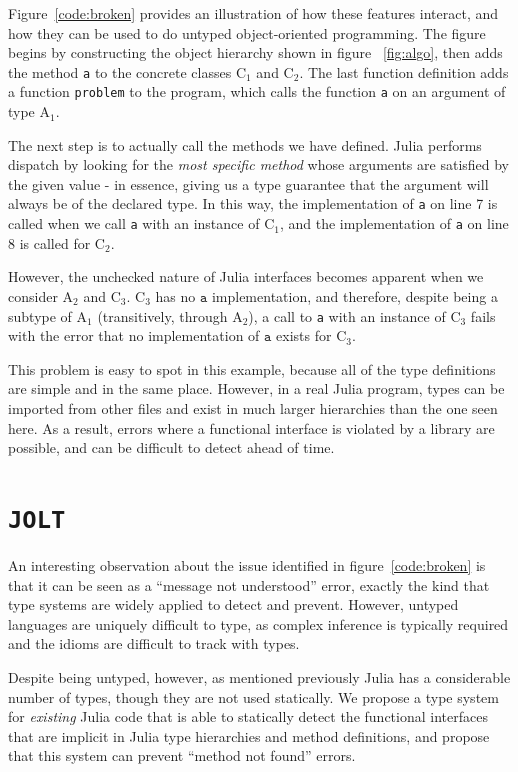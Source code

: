 \documentclass[preprint]{sigplanconf}
\newcommand{\xt}[1]{\texttt{#1}}
\newcommand{\jolt}{\xt{JOLT}}
\newcommand{\cnum}[2]{$\text{#1}_#2$}
\begin{document}
Figure~\ref{code:broken} provides an illustration of how these features 
interact, and how they can be used to do untyped object-oriented programming.
The figure begins by constructing the object hierarchy shown in figure~
\ref{fig:algo}, then adds the method \xt{a} to the concrete classes $\text{C}_1$ and
$\text{C}_2$. The last function definition adds a function \xt{problem} to the
program, which calls the function \xt{a} on an argument of type $\text{A}_1$.

The next step is to actually call the methods we have defined. Julia performs
dispatch by looking for the \emph{most specific method} whose arguments are
satisfied by the given value - in essence, giving us a type guarantee that the
argument will always be of the declared type. In this way, the implementation 
of \xt{a} on line 7 is called when we call \xt{a} with an instance of $\text{C}_1$,
and the implementation of \xt{a} on line 8 is called for $\text{C}_2$.

However, the unchecked nature of Julia interfaces becomes apparent when we consider
$\text{A}_2$ and $\text{C}_3$. \cnum{C}{3} has no $\xt{a}$ implementation, and
therefore, despite being a subtype of \cnum{A}{1} 
(transitively, through \cnum{A}{2}), a call to \xt{a} with an instance of \cnum{C}{3}
fails with the error that no implementation of $\xt{a}$ exists for \cnum{C}{3}.

This problem is easy to spot in this example, because all of the type definitions
are simple and in the same place. However, in a real Julia program, types can be
imported from other files and exist in much larger hierarchies than the one seen
here. As a result, errors where a functional interface is violated by a library
are possible, and can be difficult to detect ahead of time.

\section{\jolt}
An interesting observation about the issue identified in figure~\ref{code:broken}
is that it can be seen as a ``message not understood'' error, exactly the kind
that type systems are widely applied to detect and prevent. However, untyped 
languages are uniquely difficult to type, as complex inference is typically
required and the idioms are difficult to track with types.

Despite being untyped, however, as mentioned previously Julia has a considerable
number of types, though they are not used statically. We propose a type system
for \emph{existing} Julia code that is able to statically detect the functional
interfaces that are implicit in Julia type hierarchies and method definitions,
and propose that this system can prevent ``method not found'' errors.
\end{document}
